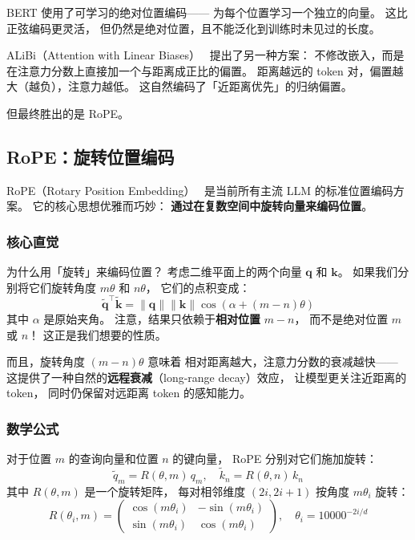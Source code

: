 BERT 使用了可学习的绝对位置编码——
为每个位置学习一个独立的向量。
这比正弦编码更灵活，
但仍然是绝对位置，且不能泛化到训练时未见过的长度。

ALiBi（Attention with Linear Biases）~\cite{press2022alibi}
提出了另一种方案：
不修改嵌入，而是在注意力分数上直接加一个与距离成正比的偏置。
距离越远的 token 对，偏置越大（越负），注意力越低。
这自然编码了「近距离优先」的归纳偏置。

但最终胜出的是 RoPE。

\subsection{RoPE：旋转位置编码}

RoPE（Rotary Position Embedding）~\cite{su2021rope}
是当前所有主流 LLM 的标准位置编码方案。
它的核心思想优雅而巧妙：
\textbf{通过在复数空间中旋转向量来编码位置}。

\subsubsection{核心直觉}

为什么用「旋转」来编码位置？
考虑二维平面上的两个向量 $\mathbf{q}$ 和 $\mathbf{k}$。
如果我们分别将它们旋转角度 $m\theta$ 和 $n\theta$，
它们的点积变成：
\[
  \tilde{\mathbf{q}}^\top \tilde{\mathbf{k}}
  = \|\mathbf{q}\| \|\mathbf{k}\| \cos(\alpha + (m-n)\theta)
\]
其中 $\alpha$ 是原始夹角。
注意，结果只依赖于\textbf{相对位置} $m - n$，
而不是绝对位置 $m$ 或 $n$！
这正是我们想要的性质。

而且，旋转角度 $(m-n)\theta$ 意味着
相对距离越大，注意力分数的衰减越快——
这提供了一种自然的\textbf{远程衰减}（long-range decay）效应，
让模型更关注近距离的 token，
同时仍保留对远距离 token 的感知能力。

\subsubsection{数学公式}

对于位置 $m$ 的查询向量和位置 $n$ 的键向量，
RoPE 分别对它们施加旋转：
\begin{equation}
  \tilde{q}_m = R(\theta, m) \, q_m, \quad
  \tilde{k}_n = R(\theta, n) \, k_n
\end{equation}
其中 $R(\theta, m)$ 是一个旋转矩阵，
每对相邻维度 $(2i, 2i+1)$ 按角度 $m \theta_i$ 旋转：
\begin{equation}
  R(\theta_i, m) = \begin{pmatrix}
    \cos(m \theta_i) & -\sin(m \theta_i) \\
    \sin(m \theta_i) & \cos(m \theta_i)
  \end{pmatrix}, \quad
  \theta_i = 10000^{-2i/d}
\end{equation}


